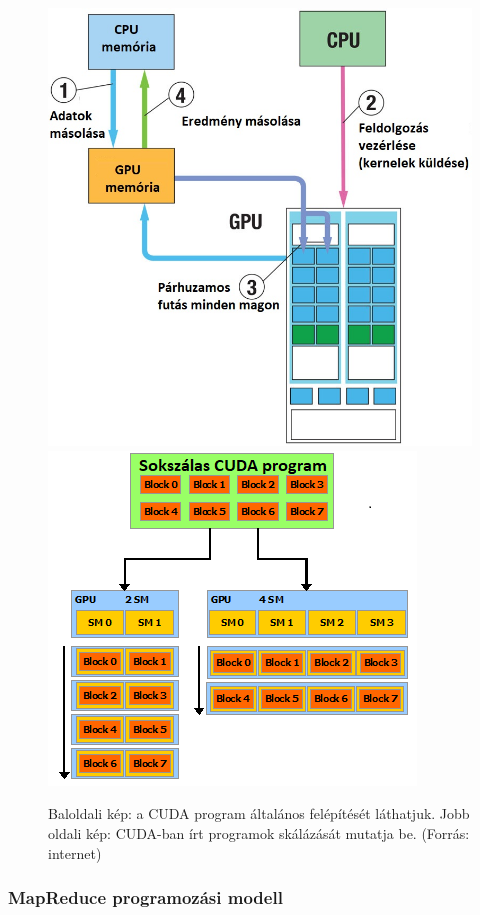 \documentclass[11pt,a4paper]{article}
\numberwithin{equation}{subsection}
\numberwithin{figure}{section}
\begin{document}
\begin{figure}[H]
\centering
\includegraphics[scale=0.32]{pic/prog/cudamodel}
\includegraphics[scale=0.8]{pic/prog/cudascale}
\caption{Baloldali kép: a CUDA program általános felépítését láthatjuk. Jobb oldali kép: CUDA-ban írt programok skálázását mutatja be. (Forrás: internet) }
\label{fig:cuda}
\end{figure}

\subsubsection{MapReduce programozási modell}\label{sec:MapReduce}
\end{document}
